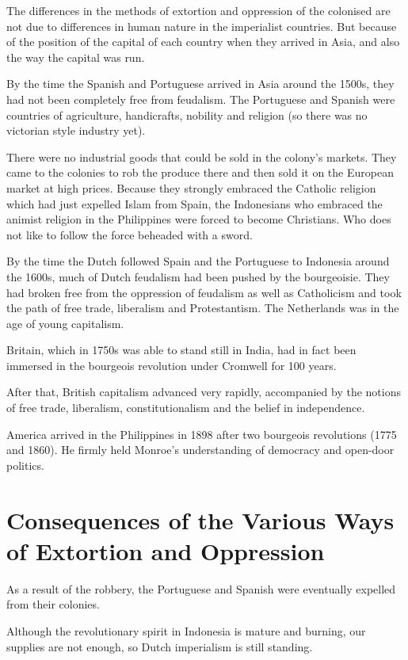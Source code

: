 The differences in the methods of extortion and oppression of the colonised are 
not due to differences in human nature in the imperialist countries. 
But because of the position of the capital of each country when they 
arrived in Asia, and also the way the capital was run.\nline

By the time the Spanish and Portuguese arrived in Asia around the 
1500s, they had not been completely free from feudalism. The Portuguese 
and Spanish were countries of agriculture, handicrafts, nobility and 
religion (so there was no victorian style industry yet).\nline

There were no industrial goods that could be sold in the colony's 
markets. They came to the colonies to rob the produce there and then sold 
it on the European market at high prices. Because they strongly embraced 
the Catholic religion which had just expelled Islam from Spain, the Indonesians 
who embraced the animist religion in the Philippines were forced to become 
Christians. Who does not like to follow the force beheaded with a sword.\nline

By the time the Dutch followed Spain and the Portuguese to Indonesia around the 
1600s, much of Dutch feudalism had been pushed by the bourgeoisie. They had broken 
free from the oppression of feudalism as well as Catholicism and took the path of 
free trade, liberalism and Protestantism. The Netherlands was in the age of young capitalism.\nline

Britain, which in 1750s was able to stand still in India, had in fact been 
immersed in the bourgeois revolution under Cromwell for 100 years.\nline

After that, British capitalism advanced very rapidly, accompanied by the 
notions of free trade, liberalism, constitutionalism and the belief in independence.\nline

America arrived in the Philippines in 1898 after two bourgeois revolutions (1775 and 1860). 
He firmly held Monroe's understanding of democracy and open-door politics.\nline

\section{Consequences of the Various Ways of Extortion and Oppression}

As a result of the robbery, the Portuguese and Spanish were eventually expelled from their colonies.\nline

Although the revolutionary spirit in Indonesia is mature and burning, our supplies are not enough, so Dutch imperialism is still standing.\nline

